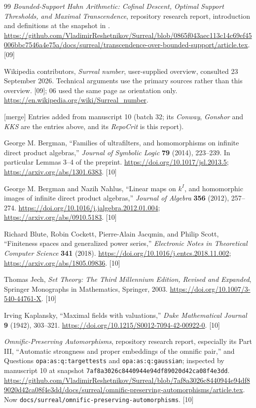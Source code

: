 \documentclass[11pt,letterpaper]{article}
\numberwithin{equation}{section}
\theoremstyle{definition}
\theoremstyle{remark}
\newcommand{\src}[1]{\textup{\textsf{\small[#1]}}}%
\newcommand{\mergetag}{\textup{\textsf{\small[merge]}}}%
\newcommand{\lbl}[1]{\nolinkurl{#1}}%
\newcommand{\fn}[1]{\nolinkurl{#1}}%
\begin{document}
\begin{thebibliography}{99}
\emph{Bounded-Support Hahn Arithmetic: Cofinal Descent, Optimal Support
Thresholds, and Maximal Transcendence}, repository research report,
introduction and definitions at the snapshot in \cite{Repo}.
\url{https://github.com/VladimirReshetnikov/Surreal/blob/0865f043aec113c14c69ef45006bbc7546a4e75a/docs/surreal/transcendence-over-bounded-support/article.tex}.
\src{09}

Wikipedia contributors, \emph{Surreal number}, user-supplied overview,
consulted 23 September 2026. Technical arguments use the primary sources
rather than this overview. \src{09}; 06 used the same page as orientation
only.
\url{https://en.wikipedia.org/wiki/Surreal_number}.

\medskip\noindent\mergetag{} Entries added from manuscript 10 (batch 32; its
\emph{Conway}, \emph{Gonshor} and \emph{KKS} are the entries above, and its
\emph{RepoCrit} is this report).

George M. Bergman,
``Families of ultrafilters, and homomorphisms on infinite direct product
algebras,'' \emph{Journal of Symbolic Logic} \textbf{79} (2014), 223--239.
In particular Lemmas 3--4 of the preprint.
\url{https://doi.org/10.1017/jsl.2013.5};
\url{https://arxiv.org/abs/1301.6383}. \src{10}

George M. Bergman and Nazih Nahlus,
``Linear maps on $k^I$, and homomorphic images of infinite direct product
algebras,'' \emph{Journal of Algebra} \textbf{356} (2012), 257--274.
\url{https://doi.org/10.1016/j.jalgebra.2012.01.004};
\url{https://arxiv.org/abs/0910.5183}. \src{10}

Richard Blute, Robin Cockett, Pierre-Alain Jacqmin, and Philip Scott,
``Finiteness spaces and generalized power series,''
\emph{Electronic Notes in Theoretical Computer Science} \textbf{341}
(2018).
\url{https://doi.org/10.1016/j.entcs.2018.11.002};
\url{https://arxiv.org/abs/1805.09836}. \src{10}

Thomas Jech, \emph{Set Theory: The Third Millennium Edition, Revised and
Expanded}, Springer Monographs in Mathematics, Springer, 2003.
\url{https://doi.org/10.1007/3-540-44761-X}. \src{10}

Irving Kaplansky, ``Maximal fields with valuations,''
\emph{Duke Mathematical Journal} \textbf{9} (1942), 303--321.
\url{https://doi.org/10.1215/S0012-7094-42-00922-0}. \src{10}

\emph{Omnific-Preserving Automorphisms}, repository research report,
especially its Part III, ``Automatic strongness and proper embeddings of the
omnific pair,'' and Questions \lbl{opa:as:q:targettests} and
\lbl{opa:as:q:gaussian}; inspected by manuscript 10 at snapshot
\texttt{7af8a3026c8440944e94df89020d42ca08f4e3dd}.
\url{https://github.com/VladimirReshetnikov/Surreal/blob/7af8a3026c8440944e94df89020d42ca08f4e3dd/docs/surreal/omnific-preserving-automorphisms/article.tex}.
Now \fn{docs/surreal/omnific-preserving-automorphisms}. \src{10}

\end{thebibliography}
\endgroup
\end{document}
